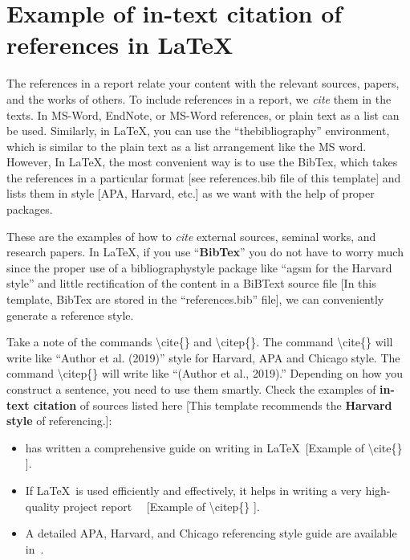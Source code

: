 \section{Example of in-text citation of references in \LaTeX} 
The references in a report relate your content with the relevant sources, papers, and the works of others. To include references in a report, we \textit{cite} them in the texts. In MS-Word, EndNote, or MS-Word references, or plain text as a list can be used. Similarly, in \LaTeX, you can use the ``thebibliography'' environment, which is similar to the plain text as a list arrangement like the MS word. However, In \LaTeX, the most convenient way is to use the BibTex, which takes the references in a particular format [see references.bib file of this template] and lists them in style [APA, Harvard, etc.] as we want with the help of proper packages.    

These are the examples of how to \textit{cite} external sources, seminal works, and research papers. In \LaTeX, if you use ``\textbf{BibTex}'' you do not have to worry much since the proper use of a bibliographystyle package like ``agsm for the Harvard style'' and little rectification of the content in a BiBText source file [In this template, BibTex are stored in the ``references.bib'' file], we can conveniently generate  a reference style. 

Take a note of the commands \textbackslash cite\{\} and \textbackslash citep\{\}. The command \textbackslash cite\{\} will write like ``Author et al. (2019)'' style for Harvard, APA and Chicago style. The command \textbackslash citep\{\} will write like ``(Author et al., 2019).'' Depending on how you construct a sentence, you need to use them smartly. Check the examples of \textbf{in-text citation} of sources listed here [This template recommends the \textbf{Harvard style} of referencing.]:
\begin{itemize}
    \item \cite{lamport1994latex} has written a comprehensive guide on writing in \LaTeX ~[Example of \textbackslash cite\{\} ].
    \item If \LaTeX~is used efficiently and effectively, it helps in writing a very high-quality project report~\citep{lamport1994latex} ~[Example of \textbackslash citep\{\} ].   
    \item A detailed APA, Harvard, and Chicago referencing style guide are available in~\citep{uor_refernce_style}.
\end{itemize}

